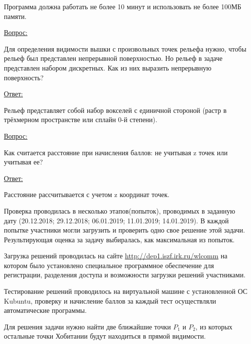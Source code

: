 Программа должна работать не более 10 минут и использовать не более 100МБ памяти.

\commentsSection

\underline{Вопрос:} 

Для определения видимости вышки с произвольных точек рельефа нужно, чтобы рельеф был представлен непрерывной поверхностью. Но рельеф в задаче представлен набором дискретных. Как из них выразить непрерывную поверхность?

\underline{Ответ:} 

Рельеф представляет собой набор вокселей с единичной стороной (растр в трёхмерном пространстве или сплайн 0-й степени).

\underline{Вопрос:} 

Как считается расстояние при начисления баллов: не учитывая z точек или учитывая ее?

\underline{Ответ:} 

Расстояние рассчитывается с учетом z координат точек.

Проверка проводилась в несколько этапов(попыток), проводимых в заданную дату (20.12.2018; 29.12.2018; 06.01.2019; 11.01.2019; 14.01.2019). В каждой попытке участники могли загрузить и проверить одно свое решение этой задачи.
Результирующая оценка за задачу выбиралась, как максимальная из попыток.

Загрузка решений проводилась на сайте \url{http://dep1.iszf.irk.ru/wlcomm} на котором было установлено специальное программное обеспечение для регистрации, разделения доступа и возможности загрузки решений участниками.

Тестирование решений проводилось на виртуальной машине с установленной ОС Kubuntu, проверку и начисление баллов за каждый тест осуществляли автоматические программы.

\explanationSection

Для решения задачи нужно найти две ближайшие точки $P_1$ и $P_2$, из которых остальные точки Хобитании будут находиться в прямой видимости.

